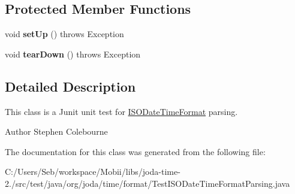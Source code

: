 \subsection*{Protected Member Functions}
\begin{DoxyCompactItemize}
\item 
\hypertarget{classorg_1_1joda_1_1time_1_1format_1_1_test_i_s_o_date_time_format_parsing_afd73f69743c18f82e3a5cc5651a29d92}{void {\bfseries set\-Up} ()  throws Exception }\label{classorg_1_1joda_1_1time_1_1format_1_1_test_i_s_o_date_time_format_parsing_afd73f69743c18f82e3a5cc5651a29d92}

\item 
\hypertarget{classorg_1_1joda_1_1time_1_1format_1_1_test_i_s_o_date_time_format_parsing_ad47f5c5cea318435bcf722d4e6fc6cea}{void {\bfseries tear\-Down} ()  throws Exception }\label{classorg_1_1joda_1_1time_1_1format_1_1_test_i_s_o_date_time_format_parsing_ad47f5c5cea318435bcf722d4e6fc6cea}

\end{DoxyCompactItemize}


\subsection{Detailed Description}
This class is a Junit unit test for \hyperlink{classorg_1_1joda_1_1time_1_1format_1_1_i_s_o_date_time_format}{I\-S\-O\-Date\-Time\-Format} parsing.

\begin{DoxyAuthor}{Author}
Stephen Colebourne 
\end{DoxyAuthor}


The documentation for this class was generated from the following file\-:\begin{DoxyCompactItemize}
\item 
C\-:/\-Users/\-Seb/workspace/\-Mobii/libs/joda-\/time-\/2./src/test/java/org/joda/time/format/Test\-I\-S\-O\-Date\-Time\-Format\-Parsing.\-java\end{DoxyCompactItemize}
